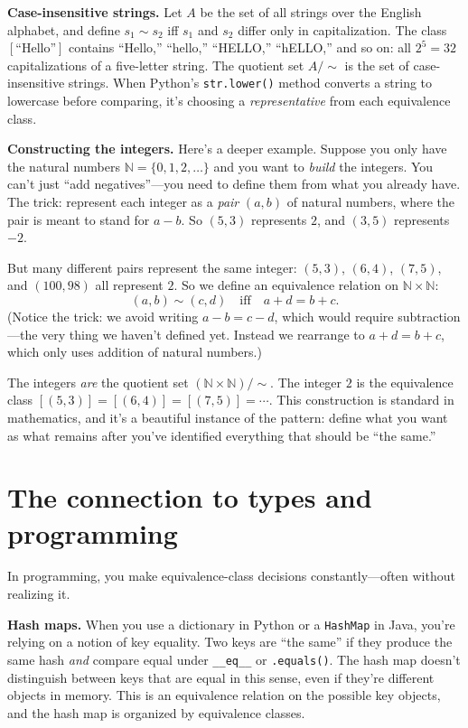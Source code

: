\documentclass[11pt]{article}
\begin{document}
\medskip

\textbf{Case-insensitive strings.} Let $A$ be the set of all strings over
the English alphabet, and define $s_1 \sim s_2$ iff $s_1$ and $s_2$
differ only in capitalization. The class $[\text{``Hello''}]$ contains
``Hello,'' ``hello,'' ``HELLO,'' ``hELLO,'' and so on: all $2^5 = 32$
capitalizations of a five-letter string. The quotient set $A / {\sim}$
is the set of case-insensitive strings. When Python's
\texttt{str.lower()} method converts a string to lowercase before
comparing, it's choosing a \emph{representative} from each equivalence
class.

\medskip

\textbf{Constructing the integers.} Here's a deeper example. Suppose you only have the natural numbers $\mathbb{N} = \{0, 1, 2, \ldots\}$ and you want to \emph{build} the integers. You can't just ``add negatives''---you need to define them from what you already have. The trick: represent each integer as a \emph{pair} $(a, b)$ of natural numbers, where the pair is meant to stand for $a - b$. So $(5, 3)$ represents $2$, and $(3, 5)$ represents $-2$.

But many different pairs represent the same integer: $(5, 3)$, $(6, 4)$, $(7, 5)$, and $(100, 98)$ all represent $2$. So we define an equivalence relation on $\mathbb{N} \times \mathbb{N}$:
\[
  (a, b) \sim (c, d) \quad \text{iff} \quad a + d = b + c.
\]
(Notice the trick: we avoid writing $a - b = c - d$, which would require subtraction---the very thing we haven't defined yet. Instead we rearrange to $a + d = b + c$, which only uses addition of natural numbers.)

The integers \emph{are} the quotient set $(\mathbb{N} \times \mathbb{N}) / {\sim}$. The integer $2$ is the equivalence class $[(5,3)] = [(6,4)] = [(7,5)] = \cdots$. This construction is standard in mathematics, and it's a beautiful instance of the pattern: define what you want as what remains after you've identified everything that should be ``the same.''

\section{The connection to types and programming}

In programming, you make equivalence-class decisions constantly---often without realizing it.

\textbf{Hash maps.} When you use a dictionary in Python or a
\texttt{HashMap} in Java, you're relying on a notion of key equality.
Two keys are ``the same'' if they produce the same hash \emph{and}
compare equal under \texttt{\_\_eq\_\_} or \texttt{.equals()}. The hash
map doesn't distinguish between keys that are equal in this sense, even
if they're different objects in memory. This is an equivalence relation
on the possible key objects, and the hash map is organized by
equivalence classes.
\end{document}
